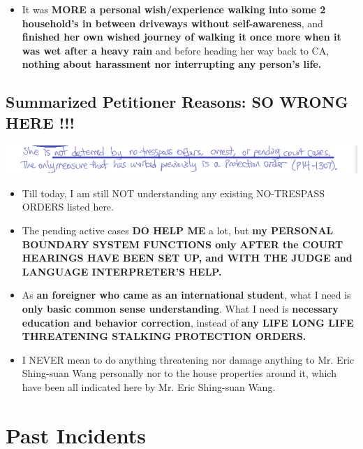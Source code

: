 \documentclass[9pt, b5paper]{article}
\begin{document}
\begin{itemize}
\item It was \textbf{MORE a personal wish/experience walking into some 2 household's in between driveways without self-awareness}, and \textbf{finished her own wished journey of walking it once more when it was wet after a heavy rain} and before heading her way back to CA, \textbf{nothing about harassment nor interrupting any person's life.}
\end{itemize}
\subsection{Summarized Petitioner Reasons: SO WRONG HERE !!!}
\label{sec-4-5}

\includegraphics[width=.9\linewidth]{./pic/dearCousin_20220920_142922.png}
\begin{itemize}
\item Till today, I am still NOT understanding any existing NO-TRESPASS ORDERS listed here.
\item The pending active cases \textbf{DO HELP ME} a lot, but \textbf{my PERSONAL BOUNDARY SYSTEM FUNCTIONS only AFTER the COURT HEARINGS HAVE BEEN SET UP, and WITH THE JUDGE and LANGUAGE INTERPRETER'S HELP.}
\item As \textbf{an foreigner who came as an international student}, what I need is \textbf{only basic common sense understanding}. What I need is \textbf{necessary education and behavior correction}, instead of \textbf{any LIFE LONG LIFE THREATENING STALKING PROTECTION ORDERS.}
\item I NEVER mean to do anything threatening nor damage anything to Mr. Eric Shing-suan Wang personally nor to the house properties around it, which have been all indicated here by Mr. Eric Shing-suan Wang.
\end{itemize}

\section{Past Incidents}
\label{sec-5}
\end{document}
